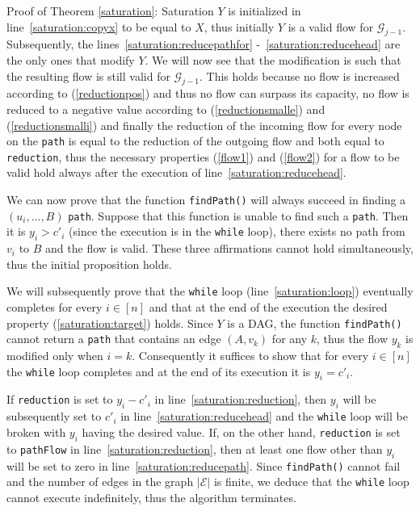 \begin{sepproof}{Proof of Theorem \ref{saturation}: Saturation}
  $Y$ is initialized in line~\ref{saturation:copyx} to be equal to $X$, thus initially $Y$ is a valid flow for
  $\mathcal{G}_{j-1}$. Subsequently, the lines~\ref{saturation:reducepathfor} -~\ref{saturation:reducehead} are the only ones
  that modify $Y$. We will now see that the modification is such that the resulting flow is still valid for
  $\mathcal{G}_{j-1}$. This holds because no flow is increased according to (\ref{reductionpos}) and thus no flow can surpass
  its capacity, no flow is reduced to a negative value according to (\ref{reductionsmalle}) and (\ref{reductionsmalli}) and
  finally the reduction of the incoming flow for every node on the \texttt{path} is equal to the reduction of the outgoing
  flow and both equal to \texttt{reduction}, thus the necessary properties (\ref{flow1}) and (\ref{flow2}) for a flow to be
  valid hold always after the execution of line~\ref{saturation:reducehead}.
  
  We can now prove that the function \texttt{findPath()} will always succeed in finding a $\left(u_i, ..., B\right)$
  \texttt{path}. Suppose that this function is unable to find such a \texttt{path}. Then it is $y_i > c'_i$ (since the
  execution is in the \texttt{while} loop), there exists no path from $v_i$ to $B$ and the flow is valid. These three
  affirmations cannot hold simultaneously, thus the initial proposition holds.

  We will subsequently prove that the \texttt{while} loop (line~\ref{saturation:loop}) eventually completes for every $i \in
  [n]$ and that at the end of the execution the desired property (\ref{saturation:target}) holds. Since $Y$ is a DAG, the
  function \texttt{findPath()} cannot return a \texttt{path} that contains an edge $\left(A, v_k\right)$ for any $k$, thus the
  flow $y_k$ is modified only when $i = k$. Consequently it suffices to show that for every $i \in [n]$ the \texttt{while}
  loop completes and at the end of its execution it is $y_i = c'_i$.

  If \texttt{reduction} is set to $y_i - c'_i$ in line~\ref{saturation:reduction}, then $y_i$ will be subsequently set to
  $c'_i$ in line~\ref{saturation:reducehead} and the \texttt{while} loop will be broken with $y_i$ having the desired value.
  If, on the other hand, \texttt{reduction} is set to \texttt{pathFlow} in line~\ref{saturation:reduction}, then at least one
  flow other than $y_i$ will be set to zero in line~\ref{saturation:reducepath}. Since \texttt{findPath()} cannot fail and the
  number of edges in the graph $|\mathcal{E}|$ is finite, we deduce that the \texttt{while} loop cannot execute indefinitely,
  thus the algorithm terminates.


\end{sepproof}
